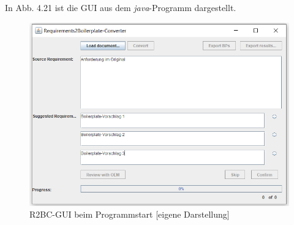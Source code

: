 \documentclass[12pt]{report}
\begin{document}
In Abb. 4.21 ist die GUI aus dem \textit{java}-Programm dargestellt.

\begin{figure}[h!]
\begin{center}
\includegraphics[scale=0.7]{Bilder/GUI-leer.png}
\caption{R2BC-GUI beim Programmstart [eigene Darstellung]}
\end{center}
\end{figure}
\end{document}
